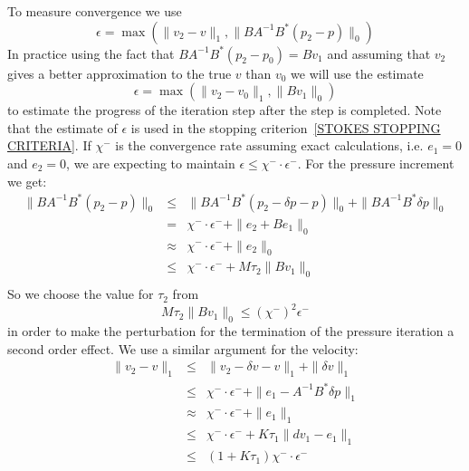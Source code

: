 To measure convergence we use
\begin{equation} 
\epsilon = \max(\|v_{2}-v\|_{1}, \|B A^{-1} B^{*} (p_{2}-p)\|_{0})
\end{equation}
In practice using the fact that $B A^{-1} B^{*} (p_{2}-p_{0}) = B v_{1}$
and assuming that $v_{2}$ gives a better approximation to the true $v$ than
$v_{0}$ we will use the estimate
\begin{equation} 
\epsilon = \max(\|v_{2}-v_{0}\|_{1}, \|B v_{1}\|_{0})
\end{equation}
to estimate the progress of the iteration step after the step is completed.
Note that the estimate of $\epsilon$ is used in the stopping
criterion~\ref{STOKES STOPPING CRITERIA}.
If $\chi^{-}$ is the convergence rate assuming exact calculations, i.e.
$e_{1}=0$ and $e_{2}=0$, we are expecting to maintain $\epsilon \le \chi^{-} \cdot \epsilon^{-}$.
For the pressure increment we get:
\begin{equation} \label{STOKES EST 1}
\begin{array}{rcl}
\|B A^{-1} B^{*} (p_{2}-p)\|_{0}
 & \le & \|B A^{-1} B^{*} (p_{2}-\delta p-p)\|_{0} +
\|B A^{-1} B^{*} \delta p\|_{0} \\
 & = & \chi^{-} \cdot \epsilon^{-} + \|e_{2} + B e_{1}\|_{0}  \\
& \approx & \chi^{-} \cdot \epsilon^{-} + \|e_{2}\|_{0} \\
& \le & \chi^{-} \cdot \epsilon^{-} + M \tau_{2} \|B v_{1}\|_{0} \\  
\end{array}
\end{equation}
So we choose the value for $\tau_{2}$ from
\begin{equation} \label{STOKES TOL2}
 M \tau_{2} \|B v_{1}\|_{0}  \le (\chi^{-})^2 \epsilon^{-}
\end{equation}
in order to make the perturbation for the termination of the pressure
iteration a second order effect. We use a similar argument for the velocity:
\begin{equation}\label{STOKES EST 2}
\begin{array}{rcl}
\|v_{2}-v\|_{1} & \le & \|v_{2}-\delta v-v\|_{1} + \| \delta v\|_{1} \\
& \le &  \chi^{-} \cdot \epsilon^{-}  + \| e_{1} -  A^{-1} B^{*}\delta p \|_{1} \\
& \approx &  \chi^{-} \cdot \epsilon^{-}  + \| e_{1} \|_{1} \\
& \le &  \chi^{-} \cdot \epsilon^{-}  +  K \tau_{1} \| dv_{1} - e_{1} \|_{1}
\\
& \le &  ( 1  + K \tau_{1}) \chi^{-} \cdot \epsilon^{-}
\end{array}
\end{equation}
